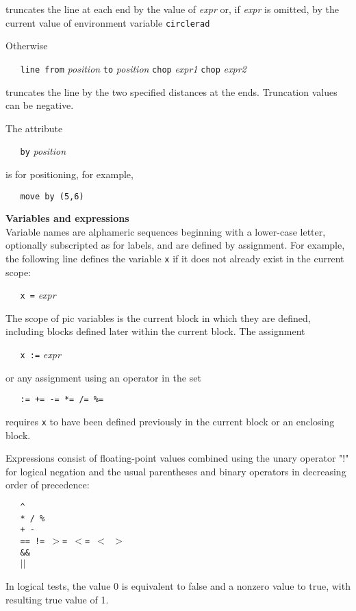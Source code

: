 truncates the line at each end by the value of
{\it expr}
or, if
{\it expr}
is omitted, by the current value of environment variable
{\tt circlerad}

Otherwise

{\tt \ \ \ line\ from}
{\it position}
{\tt to}
{\it position}
{\tt chop}
{\it expr1}
{\tt chop}
{\it expr2}

truncates the line by the two specified distances at the ends.
Truncation values can be negative.

The attribute

{\tt \ \ \ by}
{\it position}

is for positioning, for example,

{\tt \ \ \ move\ by\ (5,6)}
\par\hskip-2pc{\bf Variables and expressions}\\
Variable names are alphameric sequences beginning with a lower-case
letter, optionally subscripted as for labels, and are defined by
assignment.
For example, the following line defines the variable
{\tt x}
if it does not already exist in the current scope:

{\tt \ \ \ x\ =}
{\it expr}

The scope of
pic
variables is the current block in which they are defined, including blocks
defined later within the current block.
The assignment

{\tt \ \ \ x\ :=}
{\it expr}

or any assignment using an operator in the set

{\tt \ \ \ :=\ +=\ -=\ *=\ /=\ \%=}

requires
{\tt x}
to have been defined previously in the current block or an enclosing block.

Expressions consist of floating-point values combined using the unary
operator "!" for logical negation and the usual parentheses and binary
operators in decreasing order of precedence:

{\tt \ \ \ \^{}}
\\\hbox{}\hskip-1pt
{\tt \ \ \ *\ /\ \%}
\\\hbox{}\hskip-1pt
{\tt \ \ \ +\ -}
\\\hbox{}\hskip-1pt
{\tt \ \ \ ==\ !=\ $>$=\ $<$=\ $<$\ $>$}
\\\hbox{}\hskip-1pt
{\tt \ \ \ \&\&}
\\\hbox{}\hskip-1pt
{\tt \ \ \ $|$$|$}

In logical tests, the value 0 is equivalent to false and a nonzero value
to true, with resulting true value of 1.

